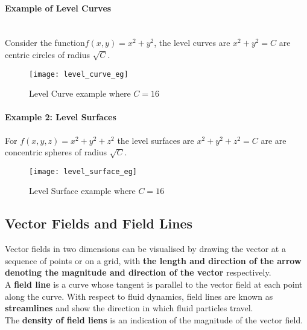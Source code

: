 \documentclass[11pt]{article}
\begin{document}
    \paragraph{Example of Level Curves}\\
    Consider the function$f(x,y) = x^2 + y^2$, the level curves are $x^2 + y^2 = C$ are centric circles of radius $\sqrt {C}$.
    \begin{figure}[h]
        \label{fig:figure2}
        \begin{center}
            \texttt{[image: level\_curve\_eg]}
            \caption{Level Curve example where $C = 16$}
        \end{center}
    \end{figure}
    \paragraph{Example 2: Level Surfaces}
    For $f(x,y,z) = x^2 + y^2 + z^2$ the level surfaces are $ x^2 + y^2 + z^2 = C$ are are concentric spheres
    of radius $\sqrt {C}$.
    \begin{figure}[h]
        \label{fig:figure3}
        \begin{center}
            \texttt{[image: level\_surface\_eg]}
            \caption{Level Surface example where $C = 16$}
        \end{center}
    \end{figure}
    \subsection{Vector Fields and Field Lines}\label{subsec:vector-fields-and-field-lines}
    Vector fields in two dimensions can be visualised by drawing the vector at a sequence of points or on a grid,
    with \textbf{the length and direction of the arrow denoting the magnitude and direction of the vector} respectively.
    \\
    A \textbf{field line} is a curve whose tangent is parallel to the vector field at each point along the curve.
    With respect to fluid dynamics, field lines are known as \textbf{streamlines} and show the direction in which
    fluid particles travel.\\
    The \textbf{density of field liens} is an indication of the magnitude of the vector field.\\
\end{document}
